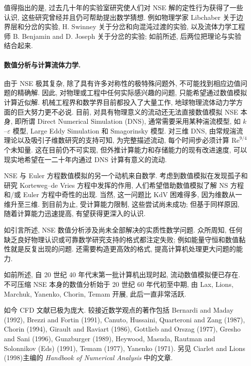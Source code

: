 值得指出的是, 过去几十年的实验室研究使人们对 NSE 解的定性行为获得了一些认识, 这些研究曾经并且仍可帮助提出数学猜想. 例如物理学家 Libchaber 关于边界层和分岔的实验, H. Swinney 关于分岔和向混沌过渡的实验, 以及流体力学工程师 B. Benjamin and D. Joseph 关于分岔的实验; 如前所述, 后两位把理论与实验结合起来.

\paragraph{数值分析与计算流体力学.}
由于 NSE 极其复杂, 除了具有许多对称性的极特殊问题外, 不可能找到相应边值问题的精确解. 因此, 对物理或工程中任何实际感兴趣的问题, 只能希望通过数值模拟计算近似解. 机械工程界和数学界目前都投入了大量工作, 地球物理流体动力学方面的巨大努力更不必说. 目前, 对具有物理意义的流动还无法直接数值模拟 NSE 本身, 即所谓 Direct Numerical Simulation (DNS), 通常需要采用某种湍流模型, 如 $k$--$\varepsilon$ 模型, Large Eddy Simulation 和 Smagorinsky 模型. 对三维 DNS, 由常规湍流理论以及吸引子维数研究的支持可知, 为完整描述流动, 每个时间步必须计算 $\mathrm{Re}^{9/4}$ 个未知量. 这在目前仍不可实现, 但外推计算能力和存储能力的现有改进速度, 可以现实地希望在一二十年内通过 DNS 计算有意义的流动.

NSE 与 Euler 方程数值模拟的另一个动机来自数学. 考虑到数值模拟在发现孤子和研究 Korteweg--de Vries 方程中发挥的作用, 人们希望借助数值模拟了解 NS 方程和/或 Euler 方程中奇性的出现. 当然, 这一问题比 KdV 困难得多, 因为维数从一维升至三维. 到目前为止, 受计算能力限制, 这些尝试尚未成功; 但基于同样原因, 随着计算能力迅速提高, 有望获得更深入的认识.

如引言所述, NSE 数值分析涉及尚未全部解决的实质性数学问题. 众所周知, 任何缺乏良好物理认识或可靠数学研究支持的格式都注定失败; 例如能量守恒和数值黏性就是反复出现的问题. 还需要构造更高效的格式, 提高计算机处理更大问题的能力.

如前所述, 自 20 世纪 40 年代末第一批计算机出现时起, 流动数值模拟便已存在. 不可压缩 NSE 本身的数值分析始于 20 世纪 60 年代初至中期, 由 Lax, Lions, Marchuk, Yanenko, Chorin, Temam 开展, 此后一直非常活跃.

\hypertarget{appendix-03-page-376}{}
如今 CFD 文献已极为庞大. 较接近数学观点的著作包括 Bernardi and Maday (1992), Brezzi and Fortin (1991), Canuto, Hussaini, Quarteroni and Zang (1987), Chorin (1994), Girault and Raviart (1986), Gottlieb and Orszag (1977), Gresho and Sani (1996), Gunzburger (1989), Heywood, Masuda, Rautman and Solonnikov (Eds) (1991), Temam (1977), Yanenko (1971). 另见 Ciarlet and Lions (1998)主编的 \emph{Handbook of Numerical Analysis} 中的文章.

